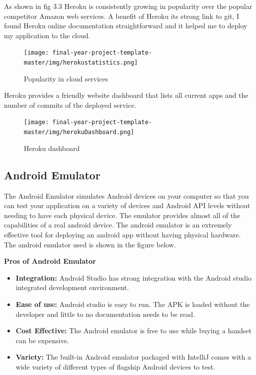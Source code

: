 As shown in fig 3.3 Heroku is consistently growing in popularity over the popular competitor 
Amazon web services\cite{herokuawsstat}. A  benefit of Heroku  its strong link to git, I found Heroku online documentation  straightforward and it helped me  to deploy my application to the cloud.

   \begin{figure}[H]
  \centering
     \texttt{[image: final-year-project-template-master/img/herokustatistics.png]}
     \caption{Popularity in cloud services }
\end{figure}

Heroku provides a friendly website dashboard that lists all current apps and the number of commits of the deployed service.

\begin{figure}[H]
  \centering
    \texttt{[image: final-year-project-template-master/img/herokuDashboard.png]}
     \caption{Heroku  dashboard }
\end{figure}


\subsection{Android Emulator}

The Android Emulator simulates Android devices on your computer so that you can test your application on a variety of devices and Android API levels without needing to have each physical device. The emulator provides almost all of the capabilities of a real android device. The android emulator is an extremely effective tool for deploying an android app without having physical hardware. The android emulator used is shown in the figure below. 

\textbf{Pros of Android Emulator} 
\begin{itemize}
  \item \textbf{Integration:} Android Studio has strong integration with the Android studio integrated development environment.
  
 \item \textbf{Ease of use:}  Android studio is  easy to run. The APK is loaded without the developer and little to no documentation needs to be read.
  
   \item \textbf{Cost Effective:}  The Android emulator is free to use while buying a handset can be expensive.
   
    \item \textbf{Variety:} The built-in Android emulator packaged with IntelliJ comes with a wide variety of different types of flagship Android devices to test.
\end{itemize}


